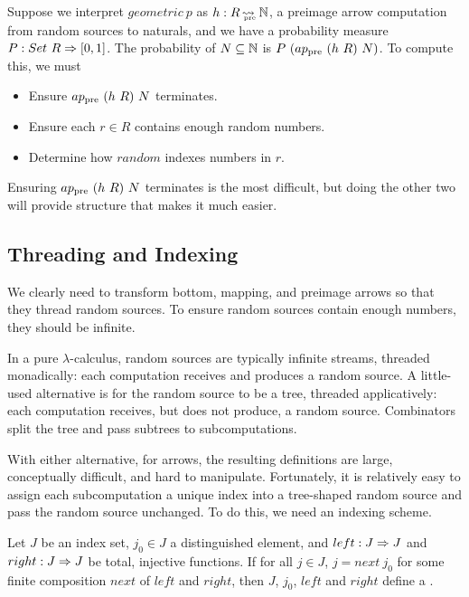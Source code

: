Suppose we interpret $geometric~p$ as $h : R \operatorname{\rightsquigarrow_{\mspace{-19mu}_\mathrm{pre}}} \mathbb{N}$, a preimage arrow computation from random sources to naturals, and we have a probability measure $P : Set~R \Rightarrow [0,1]$.
The probability of $N \subseteq \mathbb{N}$ is $P~(ap_\mathrm{pre}~(h~R)~N)$.
To compute this, we must
\begin{itemize}
	\item Ensure $ap_\mathrm{pre}~(h~R)~N$ terminates.
	\item Ensure each $r \in R$ contains enough random numbers.
	\item Determine how $random$ indexes numbers in $r$.
\end{itemize}
Ensuring $ap_\mathrm{pre}~(h~R)~N$ terminates is the most difficult, but doing the other two will provide structure that makes it much easier.

\subsection{Threading and Indexing}
\label{sec:threading-and-indexing}

We clearly need to transform bottom, mapping, and preimage arrows so that they thread random sources.
To ensure random sources contain enough numbers, they should be infinite.

In a pure $\lambda$-calculus, random sources are typically infinite streams, threaded monadically: each computation receives and produces a random source.
A little-used alternative is for the random source to be a tree, threaded applicatively: each computation receives, but does not produce, a random source.
Combinators split the tree and pass subtrees to subcomputations.

With either alternative, for arrows, the resulting definitions are large, conceptually difficult, and hard to manipulate.
Fortunately, it is relatively easy to assign each subcomputation a unique index into a tree-shaped random source and pass the random source unchanged.
To do this, we need an indexing scheme.

\begin{definition}
Let $J$ be an index set, $j_0 \in J$ a distinguished element, and $left : J \Rightarrow J$ and $right : J \Rightarrow J$ be total, injective functions. If for all $j \in J$, $j = next~j_0$ for some finite composition $next$ of $left$ and $right$, then $J$, $j_0$, $left$ and $right$ define a .
\end{definition}

